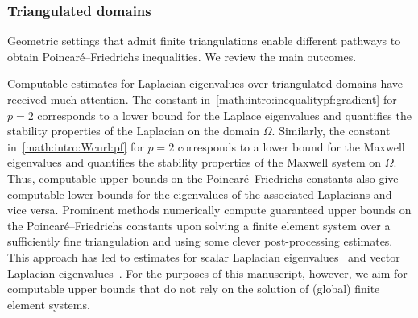 \documentclass[10pt,a4paper]{article}
\begin{document}
\subsubsection{Triangulated domains}

Geometric settings that admit finite triangulations enable different pathways to obtain Poincar\'e--Friedrichs inequalities.
We review the main outcomes.

Computable estimates for Laplacian eigenvalues over triangulated domains have received much attention.
The constant in~\eqref{math:intro:inequalitypf:gradient} for $p=2$ corresponds to a lower bound for the Laplace eigenvalues and quantifies the stability properties of the Laplacian on the domain $\Omega$.
Similarly, the constant in~\eqref{math:intro:Wcurl:pf} for $p=2$ corresponds to a lower bound for the Maxwell eigenvalues and quantifies the stability properties of the Maxwell system on $\Omega$.
Thus, computable upper bounds on the Poincar\'e--Friedrichs constants also give computable lower bounds for the eigenvalues of the associated Laplacians and vice versa.
Prominent methods numerically compute guaranteed upper bounds on the Poincar\'e--Friedrichs constants upon solving a finite element system over a sufficiently fine triangulation and using some clever post-processing estimates.
This approach has led to estimates for scalar Laplacian eigenvalues~\cite{Cars_Ged_LB_eigs_14,Liu_fram_eigs_15} and vector Laplacian eigenvalues~\cite{gallistl2023computational}.
For the purposes of this manuscript, however, we aim for computable upper bounds that do not rely on the solution of (global) finite element systems.
\end{document}
